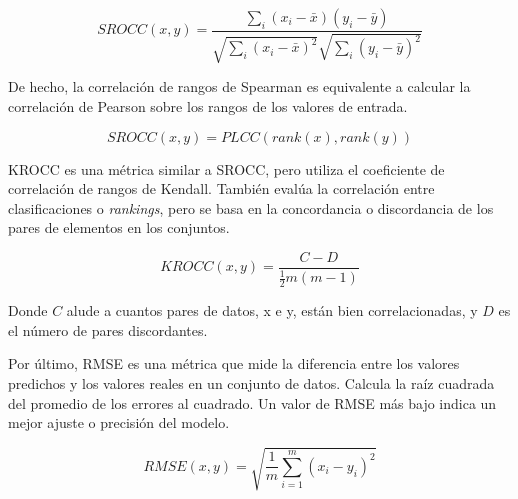 \begin{equation}
  SROCC(x,y) = \frac{\sum_i (x_i - \bar x)(y_i - \bar y)}{\sqrt{\sum_i (x_i - \bar x)^2}\sqrt{\sum_i (y_i - \bar y)^2}}
\label{eq:SROCC}
\end{equation}

De hecho, la correlación de rangos de Spearman es equivalente a calcular 
la correlación de Pearson sobre los rangos de los valores de entrada.

\begin{equation}
SROCC(x,y) = PLCC(rank(x), rank(y))
\label{eq:SROCCasPLCC}
\end{equation}

KROCC es una métrica similar a SROCC, pero utiliza el coeficiente de correlación 
de rangos de Kendall. También evalúa la correlación entre clasificaciones o \emph{rankings},
pero se basa en la concordancia o discordancia de los pares de elementos en los 
conjuntos.

\begin{equation}
  KROCC(x,y) = \frac{C-D}{\frac{1}{2} m (m-1)}
\label{eq:KROCC}
\end{equation}

Donde $C$ alude a cuantos pares de datos, x e y, están bien correlacionadas, 
y $D$ es el número de pares discordantes.  

Por último, RMSE es una métrica que mide la diferencia entre los valores 
predichos y los valores reales en un conjunto de datos. 
Calcula la raíz cuadrada del promedio de los errores al cuadrado. 
Un valor de RMSE más bajo indica un mejor ajuste o precisión del modelo.

\begin{equation}
  RMSE(x,y) = \sqrt{\frac{1}{m}\sum_{i=1}^m (x_i - y_i)^2}
\label{eq:RMSE}
\end{equation}



